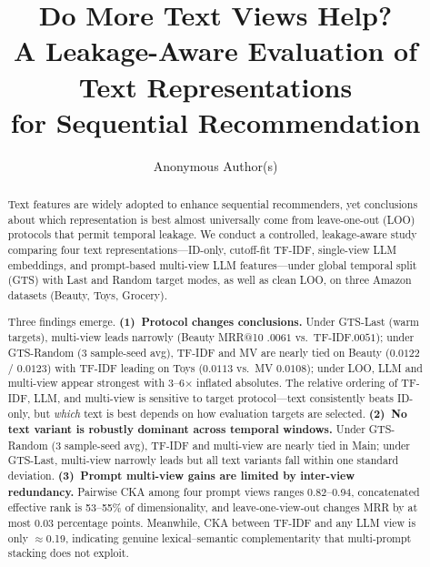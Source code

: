 \documentclass[sigconf,natbib=true,anonymous]{acmart}
\newcommand{\tfidf}{\textsc{TF-IDF}\xspace}
\newcommand{\llm}{\textsc{LLM}\xspace}
\begin{document}
\title{Do More Text Views Help?\\
A Leakage-Aware Evaluation of Text Representations\\
for Sequential Recommendation}

\author{Anonymous Author(s)}
\renewcommand{\shortauthors}{Anonymous}

\begin{abstract}
Text features are widely adopted to enhance sequential recommenders, yet conclusions about which representation is best almost universally come from leave-one-out (LOO) protocols that permit temporal leakage.
We conduct a controlled, leakage-aware study comparing four text representations---ID-only, cutoff-fit \tfidf, single-view \llm embeddings, and prompt-based multi-view \llm features---under global temporal split (GTS) with Last and Random target modes, as well as clean LOO, on three Amazon datasets (Beauty, Toys, Grocery).

Three findings emerge.
\textbf{(1)~Protocol changes conclusions.}
Under GTS-Last (warm targets), multi-view leads narrowly (Beauty MRR@10 $.0061$ vs.\ \tfidf $.0051$); under GTS-Random (3 sample-seed avg), \tfidf and MV are nearly tied on Beauty ($0.0122$ / $0.0123$) with \tfidf leading on Toys ($0.0113$ vs.\ MV $0.0108$); under LOO, \llm and multi-view appear strongest with 3--6$\times$ inflated absolutes.
The relative ordering of \tfidf, \llm, and multi-view is sensitive to target protocol---text consistently beats ID-only, but \emph{which} text is best depends on how evaluation targets are selected.
\textbf{(2)~No text variant is robustly dominant across temporal windows.}
Under GTS-Random (3 sample-seed avg), \tfidf and multi-view are nearly tied in Main; under GTS-Last, multi-view narrowly leads but all text variants fall within one standard deviation.
\textbf{(3)~Prompt multi-view gains are limited by inter-view redundancy.}
Pairwise CKA among four prompt views ranges 0.82--0.94, concatenated effective rank is 53--55\% of dimensionality, and leave-one-view-out changes MRR by at most 0.03 percentage points.
Meanwhile, CKA between \tfidf and any \llm view is only $\approx$0.19, indicating genuine lexical--semantic complementarity that multi-prompt stacking does not exploit.
\end{abstract}
\end{document}
